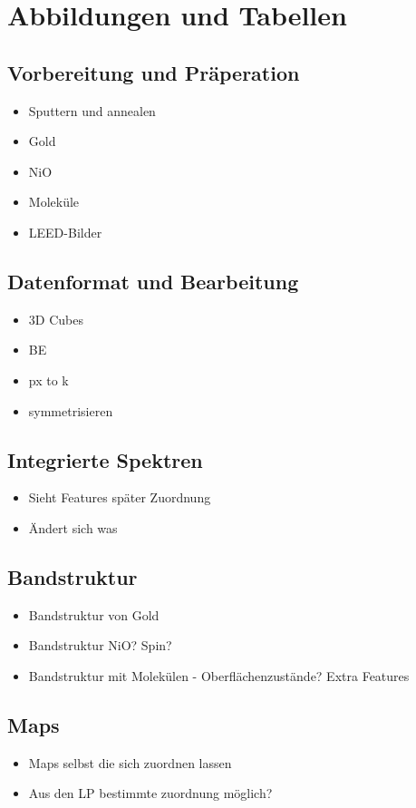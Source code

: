 \chapter{Abbildungen und Tabellen}
\section{Vorbereitung und Präperation}
    \begin{itemize}
        \item Sputtern und annealen
        \item Gold
        \item NiO
        \item Moleküle
        \item LEED-Bilder
    \end{itemize}

\section{Datenformat und Bearbeitung}
    \begin{itemize}
        \item 3D Cubes
        \item BE 
        \item px to k
        \item symmetrisieren
    \end{itemize}

\section{Integrierte Spektren}
    \begin{itemize}
        \item Sieht Features später Zuordnung
        \item Ändert sich was
    \end{itemize}

\section{Bandstruktur}
    \begin{itemize}
        \item Bandstruktur von Gold
        \item Bandstruktur NiO? Spin?
        \item Bandstruktur mit Molekülen - Oberflächenzustände? Extra Features
    \end{itemize}

\section{Maps}
    \begin{itemize}
        \item Maps selbst die sich zuordnen lassen
        \item Aus den LP bestimmte zuordnung möglich?
    \end{itemize}